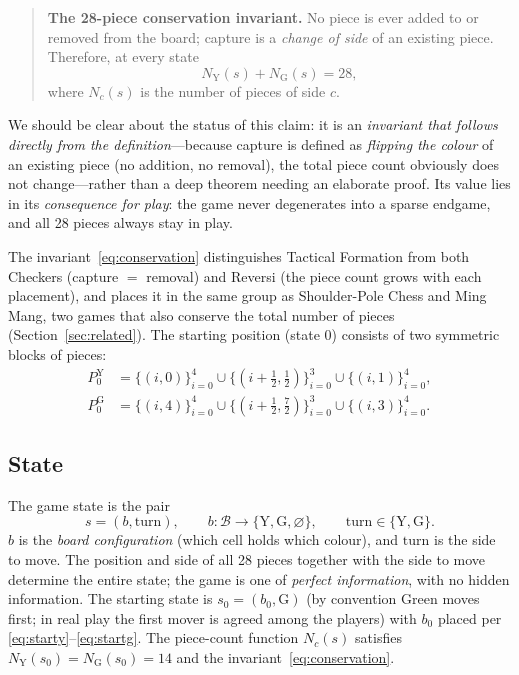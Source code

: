 \begin{quote}
\textbf{The 28-piece conservation invariant.} No piece is ever added to or
removed from the board; capture is a \emph{change of side} of an existing
piece. Therefore, at every state
\begin{equation}
N_{\mathrm Y}(s)+N_{\mathrm G}(s)=28,
\label{eq:conservation}
\end{equation}
where $N_c(s)$ is the number of pieces of side $c$.
\end{quote}

We should be clear about the status of this claim: it is an \emph{invariant
that follows directly from the definition}---because capture is defined as
\emph{flipping the colour} of an existing piece (no addition, no removal),
the total piece count obviously does not change---rather than a deep theorem
needing an elaborate proof. Its value lies in its \emph{consequence for
play}: the game never degenerates into a sparse endgame, and all 28 pieces
always stay in play.

The invariant~\eqref{eq:conservation} distinguishes Tactical Formation from
both Checkers (capture $=$ removal) and Reversi (the piece count grows with
each placement), and places it in the same group as Shoulder-Pole Chess and Ming Mang,
two games that also conserve the total number of pieces
(Section~\ref{sec:related}). The starting position (state $0$) consists of two
symmetric blocks of pieces:
\begin{align}
P^{\mathrm Y}_0 &= \{(i,0)\}_{i=0}^{4}\cup\{(i{+}\tfrac12,\tfrac12)\}_{i=0}^{3}\cup\{(i,1)\}_{i=0}^{4},
\label{eq:starty}\\
P^{\mathrm G}_0 &= \{(i,4)\}_{i=0}^{4}\cup\{(i{+}\tfrac12,\tfrac72)\}_{i=0}^{3}\cup\{(i,3)\}_{i=0}^{4}.
\label{eq:startg}
\end{align}

\subsection{State}
\label{ssec:state}

The game state is the pair
\begin{equation}
\boxed{\;s=(b,\mathrm{turn}),\qquad
b:\mathcal B\to\{\mathrm Y,\mathrm G,\varnothing\},\qquad
\mathrm{turn}\in\{\mathrm Y,\mathrm G\}.\;}
\label{eq:state}
\end{equation}
$b$ is the \emph{board configuration} (which cell holds which colour), and
$\mathrm{turn}$ is the side to move. The position and side of all 28
pieces together with the side to move determine the entire state; the game is one of
\emph{perfect information}, with no hidden information. The starting state is
$s_0=(b_0,\mathrm G)$ (by convention Green moves first; in real play the
first mover is agreed among the players) with $b_0$ placed per
\eqref{eq:starty}--\eqref{eq:startg}. The piece-count function $N_c(s)$
satisfies $N_{\mathrm Y}(s_0)=N_{\mathrm G}(s_0)=14$ and the
invariant~\eqref{eq:conservation}.

